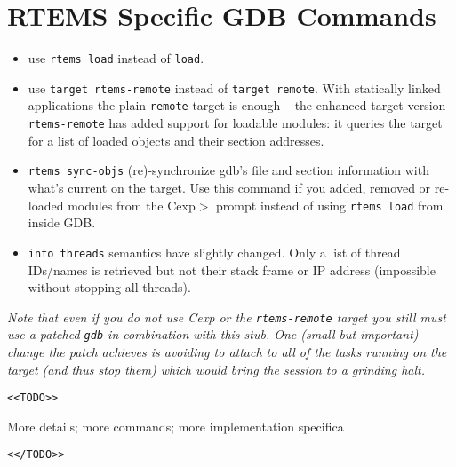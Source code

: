 \documentclass{article}
\newcommand{\cmd}[1]{{\tt #1}}
\begin{document}
\section{RTEMS Specific GDB Commands}
\begin{itemize}
\item
use \cmd{rtems load} instead of \cmd{load}.

\item
use \cmd{target rtems-remote} instead of \cmd{target remote}.
With statically linked applications the plain \cmd{remote}
target is enough -- the enhanced target version \cmd{rtems-remote} has added
support for loadable modules: it queries the target for
a list of loaded objects and their section addresses.

\item
\cmd{rtems sync-objs} (re)-synchronize gdb's file and section information
	  with what's current on the target. Use this command if you
	  added, removed or re-loaded modules from the Cexp$>$ prompt
	  instead of using \cmd{rtems load} from inside GDB.

\item
\cmd{info threads} semantics have slightly changed. Only a list
	  of thread IDs/names is retrieved but not their stack frame
	  or IP address (impossible without stopping all threads).
\end{itemize}

{\em Note that even if you do not use Cexp or the {\tt rtems-remote}
target you still must use a patched {\tt gdb} in combination with this
stub. One (small but important) change the patch achieves is avoiding
to attach to all of the tasks running on the target  (and thus stop them) 
which would bring the session to a grinding halt.}

\verb|<<TODO>>|

	More details; more commands; more implementation specifica

\verb|<</TODO>>|
	
\end{document}
